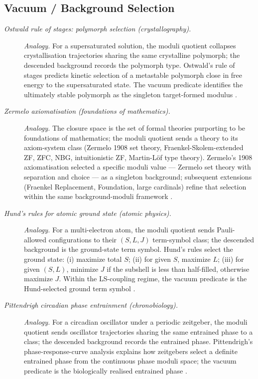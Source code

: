 \endgroup

\subsection*{ Vacuum / Background Selection}
\begingroup\small
\begin{description}
\item[\emph{Ostwald rule of stages: polymorph
selection (crystallography).}] \textit{Analogy.}
For a supersaturated solution, the moduli quotient
collapses crystallisation trajectories sharing the
same crystalline polymorph; the descended
background records the polymorph type.  Ostwald's
rule of stages predicts kinetic selection of a
metastable polymorph close in free energy to the
supersaturated state.  The vacuum predicate
identifies the ultimately stable polymorph as the
singleton target-formed modulus
\citep{Ostwald1897Studien}.

\item[\emph{Zermelo axiomatisation (foundations
of mathematics).}] \textit{Analogy.}
The closure space is the set of formal theories
purporting to be foundations of mathematics; the
moduli quotient sends a theory to its axiom-system
class (Zermelo 1908 set theory,
Fraenkel-Skolem-extended ZF, ZFC, NBG, intuitionistic
ZF,
Martin-Löf type theory).  Zermelo's 1908
axiomatisation selected a specific moduli value —
Zermelo set theory with separation and choice —
as a singleton background; subsequent extensions
(Fraenkel Replacement, Foundation, large cardinals)
refine that selection within the same 
background-moduli framework
\citep{Zermelo1908Untersuchungen}.

\item[\emph{Hund's rules for atomic ground state
(atomic physics).}] \textit{Analogy.}
For a multi-electron atom, the moduli quotient
sends Pauli-allowed configurations to their
\((S,L,J)\) term-symbol class; the descended
background is the ground-state term symbol.
Hund's rules select the ground state: (i) maximize
total \(S\); (ii) for given \(S\), maximize \(L\);
(iii) for given \((S,L)\), minimize \(J\) if the
subshell is less than half-filled, otherwise
maximize \(J\).  Within the LS-coupling regime, the
vacuum predicate is the Hund-selected ground term
symbol \citep{Hund1925Linienspektren}.

\item[\emph{Pittendrigh circadian phase entrainment
(chronobiology).}] \textit{Analogy.}
For a circadian oscillator under a periodic
zeitgeber, the moduli quotient sends oscillator
trajectories sharing the same entrained phase to a
class; the descended background records the
entrained phase.  Pittendrigh's phase-response-curve
analysis explains how zeitgebers select a definite
entrained phase from the continuous phase moduli
space; the vacuum predicate is the biologically
realised entrained phase
\citep{Pittendrigh1960Circadian}.
\end{description}
\endgroup

